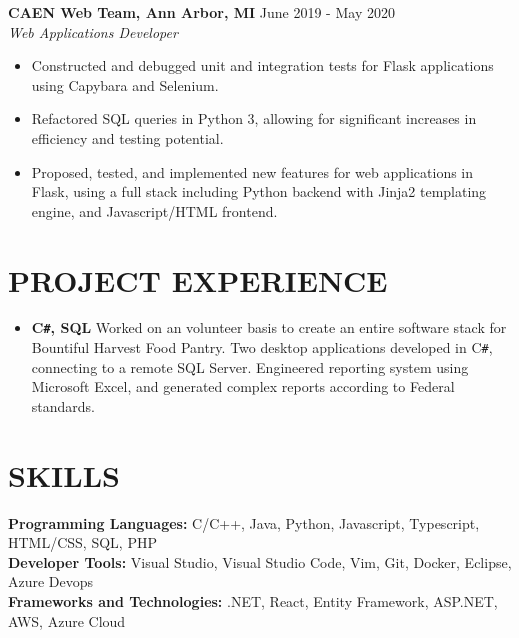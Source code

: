 \documentclass[overlapped]{res}
\begin{document}
\begin{resume}
    \textbf{CAEN Web Team, Ann Arbor, MI}
    \hfill June 2019 - May 2020 \\
    {\sl Web Applications Developer}
    \begin{itemize}  \itemsep -2pt %
        \item Constructed and debugged unit and integration tests for Flask applications using Capybara and Selenium.
        \item Refactored SQL queries in Python 3, allowing for significant increases in efficiency and testing potential.
        \item Proposed, tested, and implemented new features for web applications in Flask, using a full stack including Python backend with Jinja2 templating engine, and Javascript/HTML frontend.
              
    \end{itemize}
    
    \section{PROJECT EXPERIENCE}
    
    \begin{itemize}[label={}]  \itemsep -2pt %
        \item \textbf{C\texttt{\#}, SQL}
              Worked on an volunteer basis to create an entire software stack for Bountiful Harvest Food Pantry. Two desktop applications developed in C\texttt{\#},
              connecting to a remote SQL Server. Engineered reporting system using Microsoft Excel, and generated complex reports according
              to Federal standards.
    \end{itemize}
    
    \section{SKILLS}
    \vspace{1mm}
    \small{
        \textbf{Programming Languages:} C/C++, Java, Python, Javascript, Typescript, HTML/CSS, SQL, PHP \\
        \textbf{Developer Tools:} Visual Studio, Visual Studio Code, Vim, Git, Docker, Eclipse, Azure Devops \\
        \textbf{Frameworks and Technologies:} .NET, React, Entity Framework, ASP.NET, AWS, Azure Cloud
    }
    
\end{resume}
\end{document}
